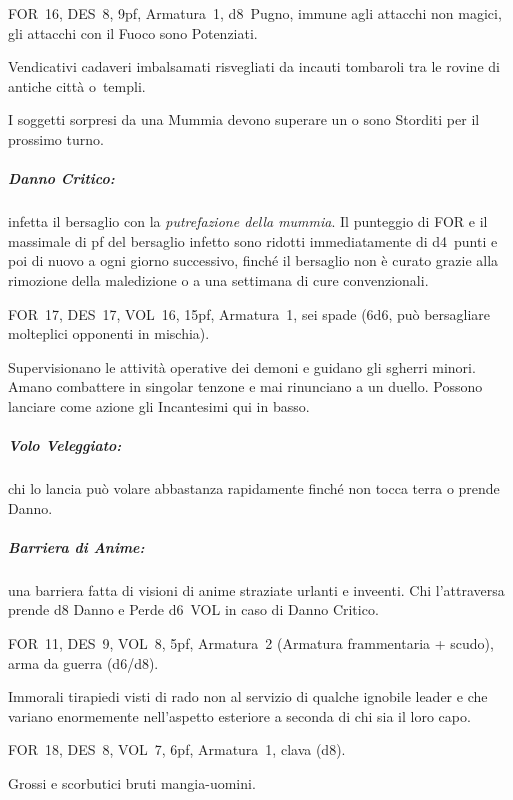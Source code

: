 \documentclass[itdr]{subfiles}
\begin{document}
\vfill

FOR~16, DES~8, 9pf, Armatura~1, d8~Pugno, immune agli attacchi non magici, gli attacchi con il Fuoco sono Potenziati.

Vendicativi cadaveri imbalsamati risvegliati da incauti tombaroli tra le rovine di antiche città o~templi.

I soggetti sorpresi da una Mummia devono superare un  o sono Storditi per il prossimo turno.

\subparagraph{Danno Critico:} infetta il bersaglio con la {\em putrefazione della mummia}. Il punteggio di FOR e il massimale di pf del bersaglio infetto sono ridotti immediatamente di d4~punti e poi di nuovo a ogni giorno successivo, finché il bersaglio non è curato grazie alla rimozione della maledizione o a una settimana di cure convenzionali.

\begin{center}
\end{center}

\break

FOR~17, DES~17, VOL~16, 15pf, Armatura~1, sei spade (6d6, può bersagliare molteplici opponenti in mischia).

Supervisionano le attività operative dei demoni e guidano gli sgherri minori. Amano combattere in singolar tenzone e mai rinunciano a un duello. Possono lanciare come azione gli Incantesimi qui in basso.

\subparagraph{Volo Veleggiato:} chi lo lancia può volare abbastanza rapidamente finché non tocca terra o prende Danno.

\subparagraph{Barriera di Anime:} una barriera fatta di visioni di anime straziate urlanti e inveenti. Chi l'attraversa prende d8 Danno e Perde d6~VOL in caso di Danno Critico.

\vfill

FOR~11, DES~9, VOL~8, 5pf, Armatura~2 (Armatura frammentaria + scudo), arma da guerra (d6/d8).

Immorali tirapiedi visti di rado non al servizio di qualche ignobile leader e che variano enormemente nell'aspetto esteriore a seconda di chi sia il loro capo.

\vfill

FOR~18, DES~8, VOL~7, 6pf, Armatura~1, clava (d8).

Grossi e scorbutici bruti mangia-uomini.

\vfill
\end{document}
